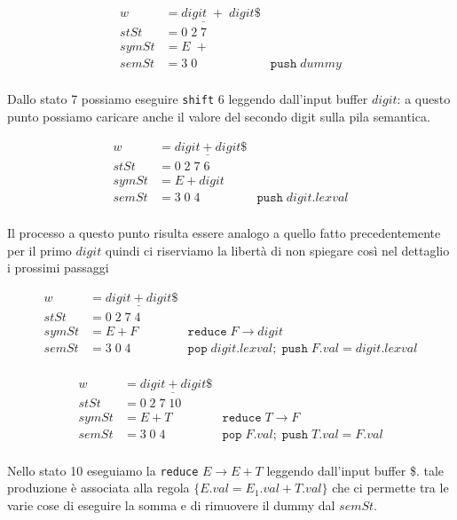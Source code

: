 \documentclass[class=book, crop=false, oneside, 12pt]{standalone}
\begin{document}
\begin{align*}
    w &= \underline{digit \;+}\; digit\$ \\
    stSt &= 0\; 2\; 7 \\
    symSt &= E\; + \\     
    semSt &= 3\; 0 &\texttt{push}\;dummy\\
\end{align*}

Dallo stato 7 possiamo eseguire \texttt{shift} 6 leggendo dall'input buffer \(digit\): a questo punto possiamo caricare anche il valore del secondo digit sulla pila semantica. 

\begin{align*}
    w &= \underline{digit + digit}\$ \\
    stSt &= 0\; 2\; 7\; 6 \\
    symSt &= E + digit \\     
    semSt &= 3\; 0\; 4 &\texttt{push}\;digit.lexval\\
\end{align*}

Il processo a questo punto risulta essere analogo a quello fatto precedentemente per il primo \(digit\) quindi ci riserviamo la libertà di non spiegare così nel dettaglio i prossimi passaggi 

\begin{align*}
    w &= \underline{digit + digit}\$ \\
    stSt &= 0\; 2\; 7\; 4 \\
    symSt &= E + F &\texttt{reduce}\; F \to digit\\     
    semSt &= 3\; 0\; 4 &\texttt{pop}\;digit.lexval;\; \texttt{push}\;F.val = digit.lexval\\
\end{align*}

\begin{align*}
    w &= \underline{digit + digit}\$ \\
    stSt &= 0\; 2\; 7\; 10 \\
    symSt &= E + T &\texttt{reduce}\; T \to F\\     
    semSt &= 3\; 0\; 4 &\texttt{pop}\;F.val;\; \texttt{push}\;T.val = F.val\\
\end{align*}

Nello stato 10 eseguiamo la \texttt{reduce} \(E \to E + T\) leggendo dall'input buffer \$. tale produzione è associata alla regola \(\{E.val = E_1.val + T.val\}\) che ci permette tra le varie cose di eseguire la somma e di rimuovere il dummy dal \(semSt\).
\end{document}
